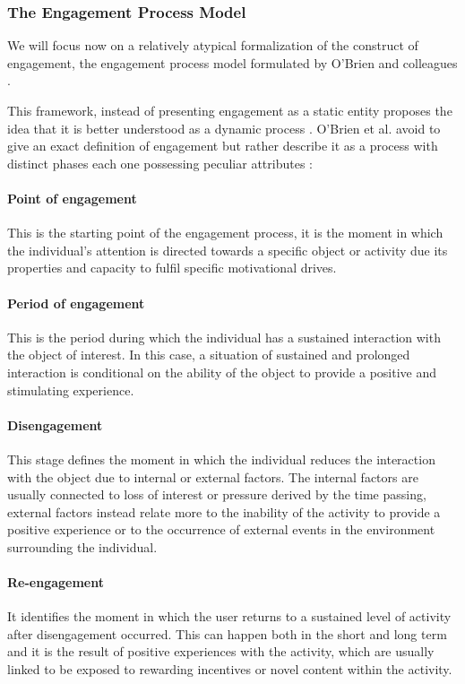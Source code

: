 \subsubsection{The Engagement Process Model}
\label{eng_proc_model}
We will focus now on a relatively atypical formalization of the construct of engagement, the engagement process model formulated by O'Brien and colleagues \cite{o2008user}. 

This framework, instead of presenting engagement as a static entity proposes the idea that it is better understood as a dynamic process \cite{o2008user}. O'Brien et al. avoid to give an exact definition of engagement but rather describe it as a process with distinct phases each one possessing peculiar attributes \cite{o2008user}:


\paragraph*{Point of engagement} This is the starting point of the engagement process, it is the moment in which the individual’s attention is directed towards a specific object or activity due its properties and capacity to fulfil specific motivational drives.

\paragraph*{Period of engagement} This is the period during which the individual has a sustained interaction with the object of interest. In this case, a situation of sustained and prolonged interaction is conditional on the ability of the object to provide a positive and stimulating experience.

\paragraph*{Disengagement} This stage defines the moment in which the individual reduces the interaction with the object due to internal or external factors. The internal factors are usually connected to loss of interest or pressure derived by the time passing, external factors instead relate more to the inability of the activity to provide a positive experience or to the occurrence of external events in the environment surrounding the individual.

\paragraph*{Re-engagement} It identifies the moment in which the user returns to a sustained level of activity after disengagement occurred. This can happen both in the short and long term and it is the result of positive experiences with the activity, which are usually linked to be exposed to rewarding incentives or novel content within the activity.

